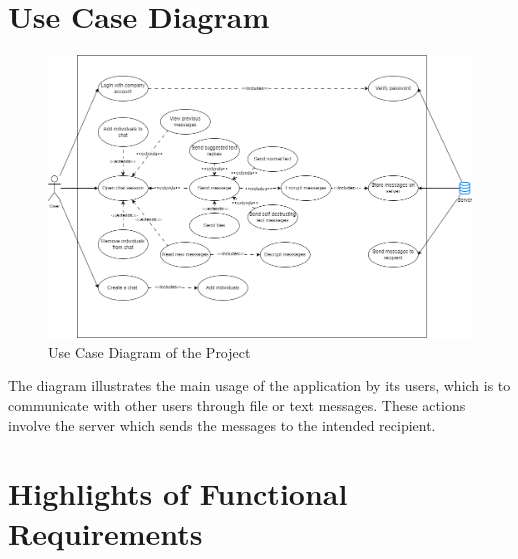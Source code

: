 \documentclass[]{article}
\begin{document}
\section{Use Case Diagram}
\label{sec:use_case_diagram}
\begin{figure}[H]
	\centering
	\includegraphics[width=1\textwidth]{figures/usecase.drawio.png}
	\caption{Use Case Diagram of the Project}
\end{figure}

The diagram illustrates the main usage of the application by its users, which is to communicate
with other users through file or text messages. These actions involve the server which sends the
messages to the intended recipient.


%
%
%

\section{Highlights of Functional Requirements}
\label{sec:functional_requirements}
\end{document}
